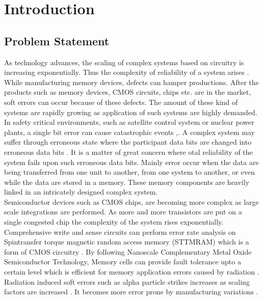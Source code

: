 \documentclass[12pt,a4paper]{report}
\begin{document}
\tableofcontents{}
\listoffigures
\listoftables


\chapter{Introduction}

\section{Problem Statement}
As technology advances, the scaling of complex systems based on circuitry is increasing exponentially. Thus the complexity of reliability of a system arises \cite{SadiMyers}. While manufacturing memory devices, defects can hamper productions. After the products such as memory devices, CMOS circuits, chips etc. are in the market, soft errors can occur because of these defects. The amount of these kind of systems are rapidly growing as application of such systems are highly demanded. \\

In safety critical environments, such as satellite control system or nuclear power plants, a single bit error can cause catastrophic events \cite{SadiKhanUnddinJan},\cite{Hashem}. A complex system may suffer through erroneous state where the participant data bits are changed into erroneous data bits \cite{SadiMyers}. It is a matter of great concern where otal reliability of the system fails upon such erroneous data bits. Mainly error occur when the data are being transferred from one unit to another, from one system to another, or even while the data are stored in a memory. These memory components are heavily linked in an intricately designed complex system.\\

Semiconductor devices such as CMOS chips, are becoming more complex as large scale integrations are performed. As more and more transistors are put on a single congested chip the complexity of the system rises exponentially. Comprehensive write and sense circuits can perform error rate analysis on Spintransfer torque magnetic random access memory (STTMRAM) which is a form of CMOS circuitry \cite{JYangetal}. By following Nanoscale Complementary Metal Oxide Semiconductor Technology, Memory cells can provide fault tolerance upto a certain level which is efficient for memory application errors caused by radiation \cite{GuoXiaoWang}. Radiation induced soft errors such as alpha particle strikes increases as scaling factors are increased \cite{Baumann}. It becomes more error prone by manufacturing variations \cite{KanekawaIbeSuga}.\\
\end{document}
